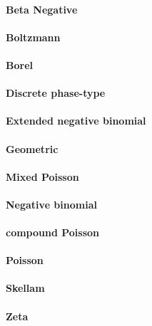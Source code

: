 \paragraph{Beta Negative}
\paragraph{Boltzmann}
\paragraph{Borel}
\paragraph{Discrete phase-type}
\paragraph{Extended negative binomial}
\paragraph{Geometric}
\paragraph{Mixed Poisson}
\paragraph{Negative binomial}
\paragraph{compound Poisson}
\paragraph{Poisson}
\paragraph{Skellam}
\paragraph{Zeta}
